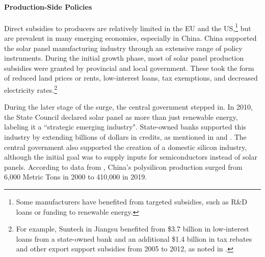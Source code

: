 \documentclass[12pt, letter]{article}
\begin{document}


\paragraph{Production-Side Policies} Direct subsidies to producers are relatively limited in the EU and the US,\footnote{Some manufacturers have benefited from targeted subsidies, such as R\&D loans or funding to renewable energy.} but are prevalent in many emerging economies, especially in China. 
China supported the solar panel manufacturing industry through an extensive range of policy instruments. During the initial growth phase, most of solar panel production subsidies were granted by provincial and local government. These took the form of reduced land prices or rents, low-interest loans, tax exemptions, and decreased electricity rates.\footnote{For example, Suntech in Jiangsu  benefited from \$3.7 billion in low-interest loans from a state-owned bank and an additional \$1.4 billion in tax rebates and other export support subsidies from 2005 to 2012, as noted in \cite{urban2016solar}.}

During the later stage of the surge, the central government stepped in. In 2010, the State Council declared solar panel as more than just renewable energy, labeling it a ``strategic emerging industry". State-owned banks supported this industry by extending billions of dollars in credits, as mentioned in \cite{lexology2010strategic} and \cite{nahm2023state}. The central government also supported the creation of a domestic silicon industry, although the initial goal was to supply inputs for semiconductors instead of solar panels. According to data from \cite{waferpro_2024_china_silicon_supply}, China's polysilicon production surged from 6,000 Metric Tons in 2000 to 410,000 in 2019. %
\end{document}
